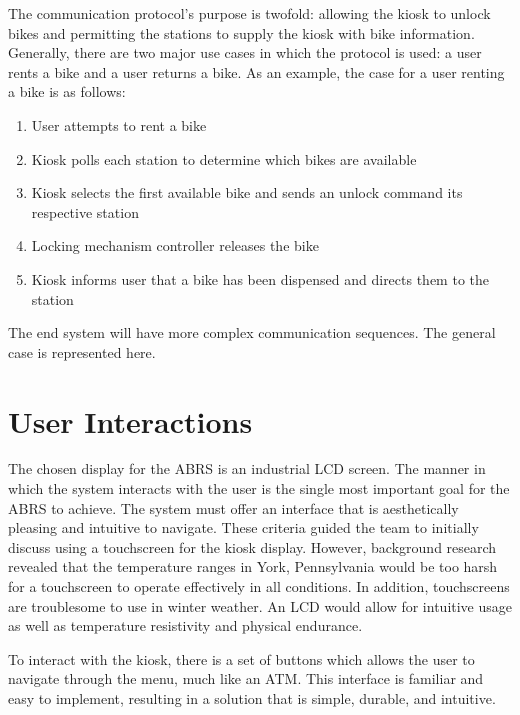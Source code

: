 \documentclass[11pt,a4paper,onesides]{report}
\begin{document}
The communication protocol's purpose is twofold: allowing the kiosk to unlock bikes and permitting the stations to supply the kiosk with bike information.  Generally, there are two major use cases in which the protocol is used: a user rents a bike and a user returns a bike.  As an example, the case for a user renting a bike is as follows: 

\begin{enumerate}

  \item User attempts to rent a bike
  \item Kiosk polls each station to determine which bikes are available
  \item Kiosk selects the first available bike and sends an unlock command its respective station
  \item Locking mechanism controller releases the bike
  \item Kiosk informs user that a bike has been dispensed and directs them to the station

\end{enumerate}

The end system will have more complex communication sequences.  The general case is represented here.

\section{User Interactions}
\label{sec:user-interactions}

The chosen display for the ABRS is an industrial LCD screen.  The manner in which the system interacts with the user is the single most important goal for the ABRS to achieve.  The system must offer an interface that is aesthetically pleasing and intuitive to navigate.  These criteria guided the team to initially discuss using a touchscreen for the kiosk display.  However, background research revealed that the temperature ranges in York, Pennsylvania would be too harsh for a touchscreen to operate effectively in all conditions.  In addition, touchscreens are troublesome to use in winter weather.  An LCD would allow for intuitive usage as well as temperature resistivity and physical endurance.

To interact with the kiosk, there is a set of buttons which allows the user to navigate through the menu, much like an ATM.  This interface is familiar and easy to implement, resulting in a solution that is simple, durable, and intuitive.  
\end{document}
